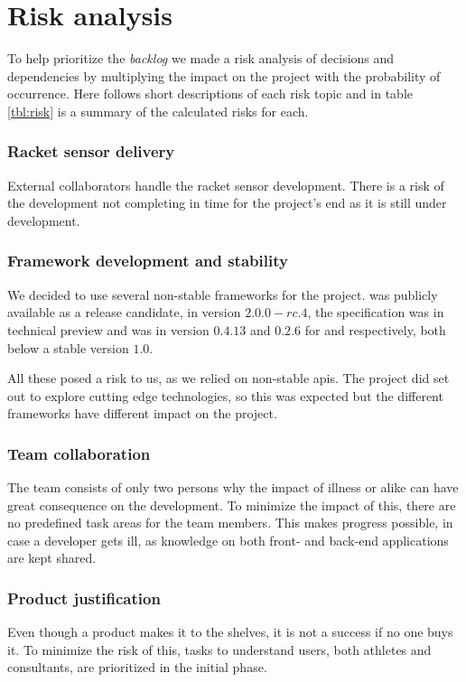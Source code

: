 \section{Risk analysis}
To help prioritize the \textit{backlog} we made a risk analysis of decisions and dependencies by multiplying the impact on the project with the probability of occurrence. 
Here follows short descriptions of each risk topic and in table \ref{tbl:risk} is a summary of the calculated risks for each.

\subsubsection*{Racket sensor delivery}
External collaborators handle the racket sensor development.
There is a risk of the development not completing in time for the project's end as it is still under development.

\subsubsection*{Framework development and stability}
We decided to use several non-stable frameworks for the project.
 was publicly available as a release candidate, in version $2.0.0-rc.4$, the  specification was in technical preview and  was in version $0.4.13$ and $0.2.6$ for  and  respectively, both below a stable version $1.0$.

All these posed a risk to us, as we relied on non-stable \glspl{api}.
The project did set out to explore cutting edge technologies, so this was expected but the different frameworks have different impact on the project.

\subsubsection*{Team collaboration}
The team consists of only two persons why the impact of illness or alike can have great consequence on the development.
To minimize the impact of this, there are no predefined task areas for the team members.
This makes progress possible, in case a developer gets ill, as knowledge on both front- and back-end applications are kept shared.

\subsubsection*{Product justification}
Even though a product makes it to the shelves, it is not a success if no one buys it.
To minimize the risk of this, tasks to understand users, both athletes and consultants, are prioritized in the initial phase.

